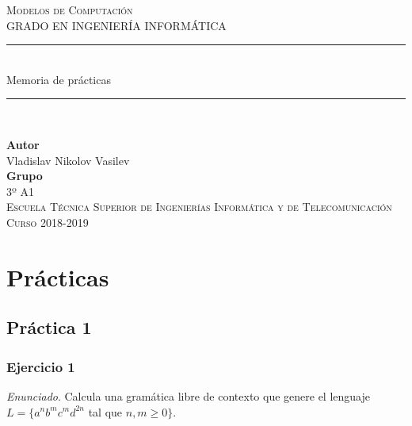 \documentclass[11pt,a4paper]{article}
\newcommand{\enu}{\textit{Enunciado}}
\begin{document}
	
	\begin{titlepage}

		\begin{minipage}{\textwidth}

			\centering
			\textsc{\Large Modelos de Computación\\[0.2cm]}
			\textsc{GRADO EN INGENIERÍA INFORMÁTICA}\\[1cm]

			\noindent\rule[-1ex]{\textwidth}{1pt}\\[3.5ex]
			{\Huge Memoria de prácticas\\}
			\noindent\rule[-1ex]{\textwidth}{2pt}\\[3.5ex]
		\end{minipage}

		\vspace{1.5cm}
		
		\begin{minipage}{\textwidth}
			\centering

			\textbf{Autor}\\ {Vladislav Nikolov Vasilev}\\[2.5ex]
			\textbf{Grupo}\\ {3º A1}\\[2.5ex]

			\vspace{1cm}
			\textsc{Escuela Técnica Superior de Ingenierías Informática y de Telecomunicación}\\
			\vspace{1cm}
			\textsc{Curso 2018-2019}
		\end{minipage}
	\end{titlepage}
	
	\tableofcontents
	\newpage
	
	\section{Prácticas}
	
	\subsection{Práctica 1}
	
		\subsubsection{Ejercicio 1}
		\enu. Calcula una gramática libre de contexto que genere el lenguaje  
		$L = \lbrace a^n b^m c^m d^{2n}$ 
		tal que 
		$ n, m \geq 0 \rbrace$. \par
		
\end{document}
